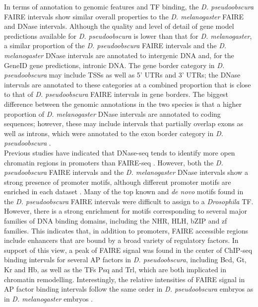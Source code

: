 In terms of annotation to genomic features and TF binding, the \emph{D. pseudoobscura} FAIRE intervals show similar overall properties to the \emph{D. melanogaster} FAIRE and DNase intervals. Although the quality and level of detail of gene model predictions available for \emph{D. pseudoobscura} is lower than that for \emph{D. melanogaster}, a similar proportion of the \emph{D. pseudoobscura} FAIRE intervals and the \emph{D. melanogaster} DNase intervals are annotated to intergenic DNA and, for the GeneID gene predictions, intronic DNA. The gene border category in \emph{D. pseudoobscura} may include TSSs as well as 5’ UTRs and 3’ UTRs; the DNase intervals are annotated to these categories at a combined proportion that is close to that of \emph{D. pseudoobscura} FAIRE intervals in gene borders. The biggest difference between the genomic annotations in the two species is that a higher proportion of \emph{D. melanogaster} DNase intervals are annotated to coding sequences; however, these may include intervals that partially overlap exons as well as introns, which were annotated to the exon border category in \emph{D. pseudoobscura} \citep{thomas_dynamic_2011}.\\

Previous studies have indicated that DNase-seq tends to identify more open chromatin regions in promoters than FAIRE-seq \citep{koohy_chromatin_2013}. However, both the \emph{D. pseudoobscura} FAIRE intervals and the \emph{D. melanogaster} DNase intervals show a strong presence of promoter motifs, although different promoter motifs are enriched in each dataset \citep{thomas_dynamic_2011}. Many of the top known and \emph{de novo} motifs found in the \emph{D. pseudoobscura} FAIRE intervals were difficult to assign to a \emph{Drosophila} TF. However, there is a strong enrichment for motifs corresponding to several major families of DNA binding domains, including the NHR, HLH, bZIP and zf families. This indicates that, in addition to promoters, FAIRE accessible regions include enhancers that are bound by a broad variety of regulatory factors. In support of this view, a peak of FAIRE signal was found in the center of ChIP-seq binding intervals for several AP factors in \emph{D. pseudoobscura}, including Bcd, Gt, Kr and Hb, as well as the TFs Psq and Trl, which are both implicated in chromatin remodelling. Interestingly, the relative intensities of FAIRE signal in AP factor binding intervals follow the same order in \emph{D. pseudoobscura} embryos as in \emph{D. melanogaster} embryos \citep{mckay_common_2013}.\\

